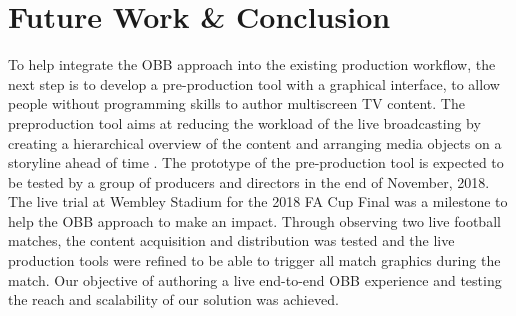 \documentclass[sigchi-a, authorversion]{acmart}
\begin{document}
\section{Future Work \& Conclusion}

To help integrate the OBB approach into the existing
production workflow, the next step is to develop a pre-production tool with a
graphical interface, to allow people without programming skills to author
multiscreen TV content. The preproduction tool aims at reducing the workload of
the live broadcasting by creating a hierarchical overview of the content and
arranging media objects on a storyline ahead of time \cite{Li:2018_TVX}. The
prototype of the pre-production tool is expected to be tested by a group of
producers and directors in the end of November, 2018. The live trial at Wembley Stadium for the 2018 FA Cup Final was a
milestone to help the OBB approach to make an impact. Through observing two live football matches, the
content acquisition and distribution was tested and the live production tools
were refined to be able to trigger all match graphics during the match.
Our objective of authoring a live end-to-end OBB experience and testing the
reach and scalability of our solution was achieved.



\end{document}
